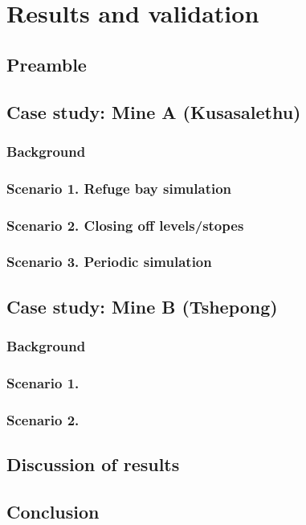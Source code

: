 \chapter{Results and validation}
\section{Preamble}
\section{Case study: Mine A \color{blue}(Kusasalethu)}
	\subsection{Background}
	\subsection{Scenario 1. Refuge bay simulation}
	\subsection{Scenario 2. Closing off levels/stopes}
	\subsection{Scenario 3. Periodic simulation}
\section{Case study: Mine B \color{blue}(Tshepong)}
	\subsection{Background}
	\subsection{Scenario 1.}
	\subsection{Scenario 2. }
\section{Discussion of results}
\section{Conclusion}